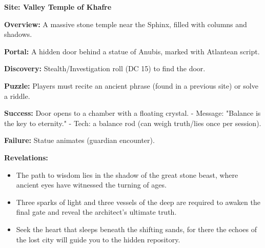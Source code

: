 \documentclass[12pt]{article}
\begin{document}
\textbf{Site: Valley Temple of Khafre}

\textbf{Overview:}  
A massive stone temple near the Sphinx, filled with columns and shadows.

\textbf{Portal:}  
A hidden door behind a statue of Anubis, marked with Atlantean script.

\textbf{Discovery:}  
Stealth/Investigation roll (DC 15) to find the door.

\textbf{Puzzle:}  
Players must recite an ancient phrase (found in a previous site) or solve a riddle.

\textbf{Success:}  
Door opens to a chamber with a floating crystal.  
- Message: "Balance is the key to eternity."  
- Tech: a balance rod (can weigh truth/lies once per session).

\textbf{Failure:}  
Statue animates (guardian encounter).

\textbf{Revelations:}
\begin{itemize}
  \item The path to wisdom lies in the shadow of the great stone beast, where ancient eyes have witnessed the turning of ages.
  \item Three sparks of light and three vessels of the deep are required to awaken the final gate and reveal the architect's ultimate truth.
  \item Seek the heart that sleeps beneath the shifting sands, for there the echoes of the lost city will guide you to the hidden repository.
\end{itemize}
\end{document}
